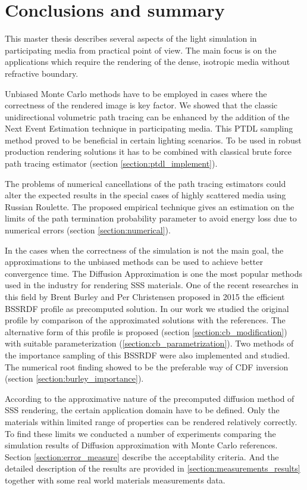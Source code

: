 \chapter{Conclusions and summary}
This master thesis describes several aspects of the light simulation in participating media from
practical point of view. The main focus is on the applications which require the rendering of the
dense, isotropic media without refractive boundary.

Unbiased Monte Carlo methods have to be employed in cases where the correctness of the rendered
image is key factor. We showed that the classic unidirectional volumetric path tracing can be
enhanced by the addition of the Next Event Estimation technique in participating media.
This PTDL sampling method proved to be beneficial in certain lighting scenarios. To be used in
robust production rendering solutions it has to be combined with classical brute force path tracing
estimator (section \ref{section:ptdl_implement}).

The problems of numerical cancellations of the path tracing estimators could alter the expected
results in the special cases of highly scattered media using Russian Roulette.
The proposed empirical technique gives an estimation on the limits of the path termination
probability parameter to avoid energy loss due to numerical errors (section
\ref{section:numerical}).

In the cases when the correctness of the simulation is not the main goal, the approximations to the
unbiased methods can be used to achieve better convergence time. The Diffusion Approximation is one
the most popular methods used in the industry for rendering SSS materials. One of the recent
researches in this field by Brent Burley and Per Christensen proposed in 2015 the efficient BSSRDF
profile as precomputed solution. In our work we studied the original profile by comparison of the
approximated solutions with the references. The alternative form of this profile is proposed
(section \ref{section:cb_modification}) with suitable parameterization
(\ref{section:cb_parametrization}). Two methods of the importance sampling of this BSSRDF were also
implemented and studied. The numerical root finding showed to be the preferable way of CDF inversion
(section \ref{section:burley_importance}).

According to the approximative nature of the precomputed diffusion method of SSS rendering, the
certain application domain have to be defined. Only the materials within limited range of properties
can be rendered relatively correctly. To find these limits we conducted a number of experiments
comparing the simulation results of Diffusion approximation with Monte Carlo references. Section
\ref{section:error_measure} describe the acceptability criteria. And the detailed description of the
results are provided in \ref{section:measurements_results} together with some real world materials
measurements data.
